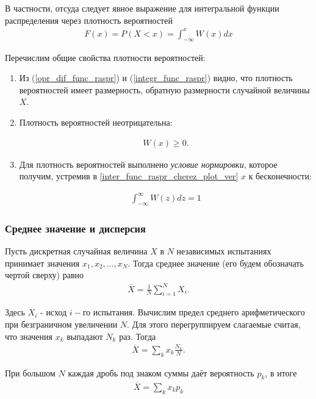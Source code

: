  В частности, отсуда следует явное выражение для интегральной функции распределения через плотность вероятностей 
 \begin{align} \label{inter_func_raspr_cherez_plot_ver}
 	F(x) = P(X < x) = \int_{-\infty}^{x}{W(x)dx}
 \end{align}
 
 Перечислим общие свойства плотности вероятностей:
 \begin{enumerate}
 	\item Из (\ref{opr_dif_func_raspr}) и (\ref{integr_func_raspr}) видно, что плотность вероятностей имеет размерность, обратную размерности случайной величины $X$.
 	\item 
 	{ 
 		Плотность вероятностей неотрицательна:
 		
 		\begin{align}
 			W(x) \geq 0.
 		\end{align}
 	}
 	\item 
 	{
 		Для плотность вероятностей выполнено \textit{условие нормировки}, которое получим, устремив в \eqref{inter_func_raspr_cherez_plot_ver} $x$ к бесконечности:
 		
 		\begin{align} \label{usl_normirovki}
 			\int_{-\infty}^{\infty}{W(z)dz} = 1
 		\end{align}
 	}
 \end{enumerate}
 
 
 \subsubsection{Среднее значение и дисперсия}
 Пусть дискретная случайная величина $X$ в $N$ независимых испытаниях принимает значения $x_1,x_2, \dots, x_N$. Тогда среднее значение (его будем обозначать чертой сверху) равно
 \begin{align} \label{sr_znach}
 	\overline X = \frac{1}{N} \sum_{i=1}^{N}X_i.
 \end{align}
 
 Здесь $X_i$ - исход $i-$го испытания. Вычислим предел среднего арифметического при безграничном увеличении $N$. Для этого перегруппируем слагаемые считая, что значения $x_k$ выпадают $N_k$ раз. Тогда
 \begin{align}
 	\overline X = \sum_{k}{x_k \frac{N_k}{N}}.
 \end{align}
 
 При большом $N$ каждая дробь под знаком суммы даёт вероятность $p_k$, в итоге 
 \begin{align} \tag{12a} \label{x_sr_sum}
 	\overline X = \sum_{k}{x_k p_k} 
 \end{align}
 
